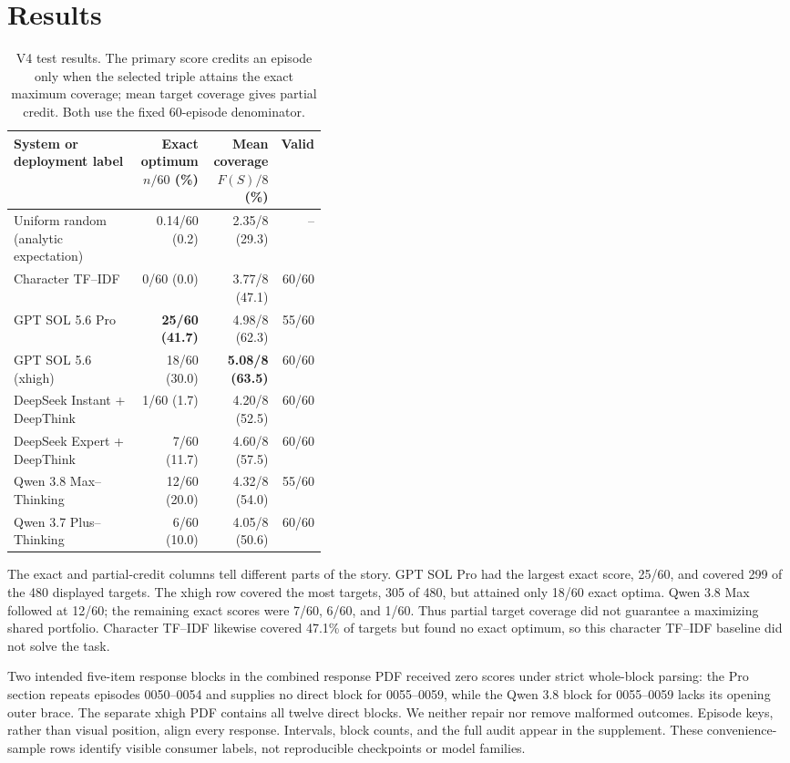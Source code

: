 \section{Results}

\begin{table}[t]
\centering
\caption{V4 test results.  The primary score credits an episode only when the
selected triple attains the exact maximum coverage; mean target coverage gives
partial credit.  Both use the fixed 60-episode denominator.}
\label{tab:main-results}
\scriptsize
\setlength{\tabcolsep}{3.2pt}
\begin{tabular}{@{}p{0.40\linewidth}rrr@{}}
\toprule
System or deployment label & \shortstack{Exact optimum\\$n/60$ (\%)} &
\shortstack{Mean coverage\\$F(S)/8$ (\%)} & Valid \\
\midrule
Uniform random (analytic expectation) & 0.14/60 (0.2) & 2.35/8 (29.3) & -- \\
Character TF--IDF & 0/60 (0.0) & 3.77/8 (47.1) & 60/60 \\
\addlinespace
GPT SOL 5.6 Pro & \textbf{25/60 (41.7)} & 4.98/8 (62.3) & 55/60 \\
GPT SOL 5.6 (xhigh) & 18/60 (30.0) & \textbf{5.08/8 (63.5)} & 60/60 \\
DeepSeek Instant + DeepThink & 1/60 (1.7) & 4.20/8 (52.5) & 60/60 \\
DeepSeek Expert + DeepThink & 7/60 (11.7) & 4.60/8 (57.5) & 60/60 \\
Qwen 3.8 Max--Thinking & 12/60 (20.0) & 4.32/8 (54.0) & 55/60 \\
Qwen 3.7 Plus--Thinking & 6/60 (10.0) & 4.05/8 (50.6) & 60/60 \\
\bottomrule
\end{tabular}
\end{table}

The exact and partial-credit columns tell different parts of the story.  GPT
SOL Pro had the largest exact score, 25/60, and covered 299 of the 480 displayed
targets.  The xhigh row covered the most targets, 305 of 480, but attained only
18/60 exact optima.  Qwen 3.8 Max followed at 12/60; the remaining exact scores
were 7/60, 6/60, and 1/60.  Thus partial target coverage did not guarantee a
maximizing shared portfolio.  Character TF--IDF likewise covered 47.1\% of
targets but found no exact optimum, so this character TF--IDF baseline did not
solve the task.

Two intended five-item response blocks in the combined response PDF received
zero scores under strict whole-block parsing: the Pro section repeats episodes 0050--0054 and supplies no
direct block for 0055--0059, while the Qwen 3.8 block for 0055--0059 lacks its
opening outer brace.  The separate xhigh PDF contains all twelve direct blocks.
We neither repair nor remove malformed outcomes.  Episode keys, rather than
visual position, align every response.  Intervals, block counts, and the full
audit appear in the supplement.  These convenience-sample rows identify visible
consumer labels, not reproducible checkpoints or model families.
